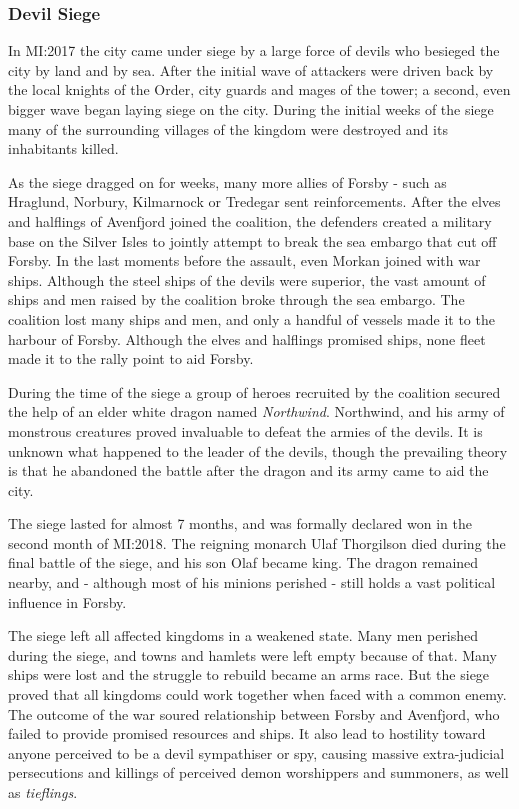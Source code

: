 \subsubsection*{Devil Siege}


In MI:2017 the city came under siege by a large force of devils who besieged
the city by land and by sea. After the initial wave of attackers were driven
back by the local knights of the Order, city guards and mages of the tower; a
second, even bigger wave began laying siege on the city. During the initial
weeks of the siege many of the surrounding villages of the kingdom were
destroyed and its inhabitants killed.

As the siege dragged on for weeks, many more allies of Forsby - such as
Hraglund, Norbury, Kilmarnock or Tredegar sent reinforcements. After the elves
and halflings of Avenfjord joined the coalition, the defenders created a
military base on the Silver Isles to jointly attempt to break the sea embargo
that cut off Forsby. In the last moments before the assault, even Morkan
joined with war ships. Although the steel ships of the devils were superior,
the vast amount of ships and men raised by the coalition broke through the sea
embargo. The coalition lost many ships and men, and only a handful of vessels
made it to the harbour of Forsby. Although the elves and halflings promised
ships, none fleet made it to the rally point to aid Forsby.

During the time of the siege a group of heroes recruited by the coalition
secured the help of an elder white dragon named \emph{Northwind}. Northwind,
and his army of monstrous creatures proved invaluable to defeat the armies of
the devils. It is unknown what happened to the leader of the devils, though
the prevailing theory is that he abandoned the battle after the dragon and its
army came to aid the city.

The siege lasted for almost 7 months, and was formally declared won in the
second month of MI:2018. The reigning monarch Ulaf Thorgilson died during the
final battle of the siege, and his son Olaf became king. The dragon remained
nearby, and - although most of his minions perished - still holds a vast
political influence in Forsby.

The siege left all affected kingdoms in a weakened state. Many men perished
during the siege, and towns and hamlets were left empty because of that. Many
ships were lost and the struggle to rebuild became an arms race. But the siege
proved that all kingdoms could work together when faced with a common enemy.
The outcome of the war soured relationship between Forsby and Avenfjord, who
failed to provide promised resources and ships. It also lead to hostility
toward anyone perceived to be a devil sympathiser or spy, causing massive
extra-judicial persecutions and killings of perceived demon worshippers and
summoners, as well as \emph{tieflings}.

